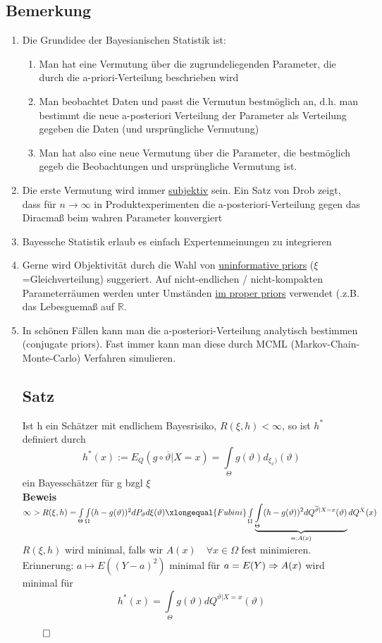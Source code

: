\documentclass[german,10pt,oneside, fleqn, a4paper]{article}
\newcommand {\R}	{\mathbb{R}}
\newcommand{\Ra}	{\Rightarrow}
\newcommand{\QED}{\begin{flushright}$\qed$\end{flushright}}
\newcommand{\beweis}{\textbf{Beweis}\\}
\newcommand{\toinf}{\rightarrow\infty}
\newcommand{\1}[1]{1_{#1}}
\newcommand{\2}[1]{\1{\brac{#1}}}
\newcommand{\qf}{\quad\forall}
\begin{document}
\subsection{Bemerkung}
\label{14.3}
\begin{enumerate}[label=(\alph*)]
\item Die Grundidee der Bayesianischen Statistik ist:
\begin{enumerate}
	\item Man hat eine Vermutung über die zugrundeliegenden Parameter, die durch die a-priori-Verteilung beschrieben wird
	\item Man beobachtet Daten und passt die Vermutun bestmöglich an, d.h. man bestimmt die neue a-posteriori Verteilung der Parameter als Verteilung gegeben die Daten (und ursprüngliche Vermutung)
	\item Man hat also eine neue Vermutung über die Parameter, die bestmöglich gegeb die Beobachtungen und ursprüngliche Vermutung ist.
\end{enumerate}	
\item Die erste Vermutung wird immer \underline{subjektiv} sein. Ein Satz von Drob zeigt, dass für $n\toinf$ in Produktexperimenten die a-posteriori-Verteilung gegen das Diracmaß beim wahren Parameter konvergiert
\item Bayessche Statistik erlaub es einfach \glqq Expertenmeinungen \grqq zu integrieren
\item Gerne wird Objektivität durch die Wahl von \underline{uninformative priors} ($\xi$=Gleichverteilung) suggeriert. Auf nicht-endlichen / nicht-kompakten Parameterräumen werden unter Umständen \underline{im proper priors} verwendet (.z.B. das Lebesguemaß auf $\R$.
\item In schönen Fällen kann man die a-posteriori-Verteilung analytisch bestimmen (conjugate priors). Fast immer kann man diese durch MCML (Markov-Chain-Monte-Carlo) Verfahren simulieren.

\subsection{Satz}
\label{14.4}
Ist h ein Schätzer mit endlichem Bayesrisiko, $R(\xi,h)<\infty$, so ist $h^*$ definiert durch\[h^*(x):=E_Q(g\circ\overline\vartheta|X=x)=\int\limits_\Theta g(\vartheta)d_{\xi_x)}(\vartheta)\]
ein Bayesschätzer für g bzgl $\xi$\\
\beweis
$\infty>R(\xi,h)=\int\limits_\Theta\int\limits_\Omega (h-g(\vartheta))^2dP_\vartheta d\xi(\vartheta)\xlongequal{Fubini}\int\limits_\Omega\underbrace{\int\limits_\Theta (h-g(\vartheta))^2dQ^{\overline\vartheta|X=x}(\vartheta)}_{=:A(x)}dQ^X(x)$\\
$R(\xi,h)$ wird minimal, falls wir $A(x)\qf x\in\Omega$ fest minimieren.\\
Erinnerung: $a\mapsto E((Y-a)^2)$ minimal für $a=E(Y)\\
\Ra A(x)$ wird minimal für \[
h^*(x)=\int\limits_\Theta g(\vartheta)dQ^{\overline\vartheta|X=x}(\vartheta)\]\QED
\end{enumerate}
\end{document}
